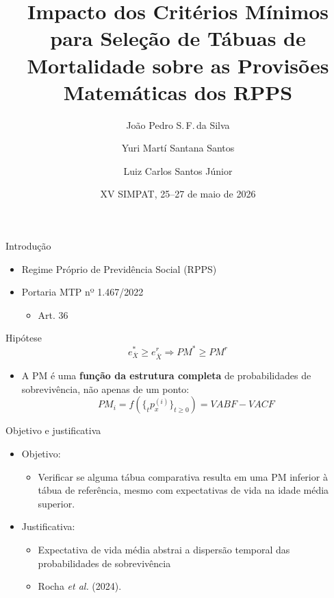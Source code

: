 \documentclass[aspectratio=169, 10pt]{beamer}
\title{Impacto dos Critérios Mínimos para Seleção de Tábuas de Mortalidade sobre as Provisões Matemáticas dos RPPS}
\author[Silva; Santos; Santos Jr.]{%
  João Pedro S.\,F.\,da Silva \and
  Yuri Martí Santana Santos \and
  Luiz Carlos Santos Júnior}
\institute[UFPB]{Universidade Federal da Paraíba}
\date{XV SIMPAT, 25--27 de maio de 2026}
\begin{document}
\begin{frame}
  \titlepage
\end{frame}

\begin{frame}{Introdução}

    \begin{itemize}
        \item[] Regime Próprio de Previdência Social (RPPS)
        \medskip
        \item[] Portaria MTP nº 1.467/2022
        \begin{itemize}
            \item Art. 36
        \end{itemize}
    \end{itemize}

    \begin{center}
    \begin{minipage}{0.55\textwidth}
        \begin{alertblock}{Hipótese}
        \[
            e_{\overline{X}}^{*} \geq e_{\overline{X}}^{r}
            \Rightarrow
            PM^{*} \geq PM^{r}
        \]
        \end{alertblock}
    \end{minipage}
    \end{center}
    \medskip
    \begin{itemize}
    \item[] A PM é uma \textbf{função da estrutura completa} de probabilidades de sobrevivência, não apenas de um ponto:
    \[ PM_i = f\!\left(\{_t p_x^{(i)}\}_{t \geq 0}\right) = VABF - VACF \]
    \end{itemize}


\end{frame}

\begin{frame}{Objetivo e justificativa}

    \begin{itemize}
        \item[] Objetivo:
        \begin{itemize}
            \item Verificar se alguma tábua comparativa resulta em uma PM inferior à tábua de referência, mesmo com expectativas de vida na idade média superior.
        \end{itemize}
        \medskip
        \item[] Justificativa:
        \begin{itemize}
            \item Expectativa de vida média abstrai a dispersão temporal das probabilidades de sobrevivência
            \item Rocha \textit{et al.} (2024).
        \end{itemize}
    \end{itemize}


\end{frame}
\end{document}
